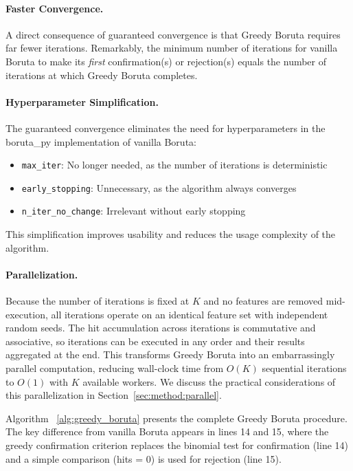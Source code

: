 \documentclass[runningheads]{llncs}
\begin{document}
\paragraph{Faster Convergence.}
A direct consequence of guaranteed convergence is that Greedy Boruta requires far fewer iterations. Remarkably, the minimum number of iterations for vanilla Boruta to make its \emph{first} confirmation(s) or rejection(s) equals the number of iterations at which Greedy Boruta completes.

\paragraph{Hyperparameter Simplification.}
The guaranteed convergence eliminates the need for hyperparameters in the boruta\_py implementation of vanilla Boruta:
\begin{itemize}
    \item \texttt{max\_iter}: No longer needed, as the number of iterations is deterministic
    \item \texttt{early\_stopping}: Unnecessary, as the algorithm always converges
    \item \texttt{n\_iter\_no\_change}: Irrelevant without early stopping
\end{itemize}
This simplification improves usability and reduces the usage complexity of the algorithm.

\paragraph{Parallelization.}
Because the number of iterations is fixed at $K$ and no features are removed mid-execution, all iterations operate on an identical feature set with independent random seeds. The hit accumulation across iterations is commutative and associative, so iterations can be executed in any order and their results aggregated at the end. This transforms Greedy Boruta into an embarrassingly parallel computation, reducing wall-clock time from $O(K)$ sequential iterations to $O(1)$ with $K$ available workers. We discuss the practical considerations of this parallelization in Section~\ref{sec:method:parallel}.

Algorithm ~\ref{alg:greedy_boruta} presents the complete Greedy Boruta procedure. The key difference from vanilla Boruta appears in lines 14 and 15, where the greedy confirmation criterion replaces the binomial test for confirmation (line 14) and a simple comparison (hits = 0) is used for rejection (line 15).
\end{document}
